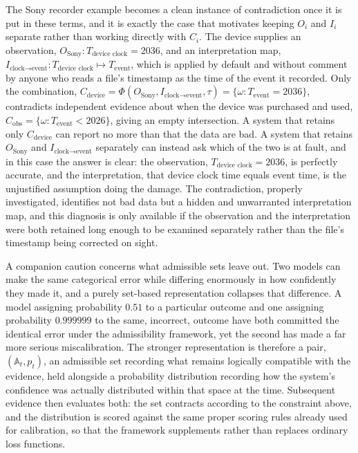 \documentclass[11pt]{article}
\begin{document}
The Sony recorder example becomes a clean instance of contradiction once it is put in these terms, and it is exactly the case that motivates keeping $O_i$ and $I_i$ separate rather than working directly with $C_i$. The device supplies an observation, $O_{\text{Sony}}: T_{\text{device clock}} = 2036$, and an interpretation map, $I_{\text{clock}\to\text{event}}: T_{\text{device clock}} \mapsto T_{\text{event}}$, which is applied by default and without comment by anyone who reads a file's timestamp as the time of the event it recorded. Only the combination, $C_{\text{device}} = \Phi(O_{\text{Sony}}, I_{\text{clock}\to\text{event}}, \tau) = \{\omega : T_{\text{event}} = 2036\}$, contradicts independent evidence about when the device was purchased and used, $C_{\text{obs}} = \{\omega : T_{\text{event}} < 2026\}$, giving an empty intersection. A system that retains only $C_{\text{device}}$ can report no more than that the data are bad. A system that retains $O_{\text{Sony}}$ and $I_{\text{clock}\to\text{event}}$ separately can instead ask which of the two is at fault, and in this case the answer is clear: the observation, $T_{\text{device clock}} = 2036$, is perfectly accurate, and the interpretation, that device clock time equals event time, is the unjustified assumption doing the damage. The contradiction, properly investigated, identifies not bad data but a hidden and unwarranted interpretation map, and this diagnosis is only available if the observation and the interpretation were both retained long enough to be examined separately rather than the file's timestamp being corrected on sight.

A companion caution concerns what admissible sets leave out. Two models can make the same categorical error while differing enormously in how confidently they made it, and a purely set-based representation collapses that difference. A model assigning probability $0.51$ to a particular outcome and one assigning probability $0.999999$ to the same, incorrect, outcome have both committed the identical error under the admissibility framework, yet the second has made a far more serious miscalibration. The stronger representation is therefore a pair, $(\mathbb{A}_t, p_t)$, an admissible set recording what remains logically compatible with the evidence, held alongside a probability distribution recording how the system's confidence was actually distributed within that space at the time. Subsequent evidence then evaluates both: the set contracts according to the constraint above, and the distribution is scored against the same proper scoring rules already used for calibration, so that the framework supplements rather than replaces ordinary loss functions.
\end{document}
